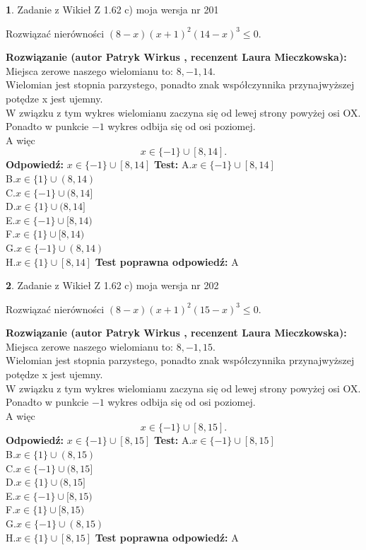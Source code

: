 \documentclass[12pt, a4paper]{article}
\theoremstyle{definition} %
\newtheorem{zad}{}
\newcommand{\zadStart}[1]{\begin{zad}#1\newline}
\newcommand{\zadStop}{\end{zad}}
\newcommand{\rozwStart}[2]{\noindent \textbf{Rozwiązanie (autor #1 , recenzent #2): }\newline}
\newcommand{\rozwStop}{\newline}
\newcommand{\odpStart}{\noindent \textbf{Odpowiedź:}\newline}
\newcommand{\odpStop}{\newline}
\newcommand{\testStart}{\noindent \textbf{Test:}\newline}
\newcommand{\testStop}{\newline}
\newcommand{\kluczStart}{\noindent \textbf{Test poprawna odpowiedź:}\newline}
\newcommand{\kluczStop}{\newline}
\begin{document}
\zadStart{Zadanie z Wikieł Z 1.62 c) moja wersja nr 201}

Rozwiązać nierówności $(8-x)(x+1)^{2}(14-x)^{3}\le0$.
\zadStop
\rozwStart{Patryk Wirkus}{Laura Mieczkowska}
Miejsca zerowe naszego wielomianu to: $8, -1, 14$.\\
Wielomian jest stopnia parzystego, ponadto znak współczynnika przy\linebreak najwyższej potędze x jest ujemny.\\ W związku z tym wykres wielomianu zaczyna się od lewej strony powyżej osi OX.\\
Ponadto w punkcie $-1$ wykres odbija się od osi poziomej.\\
A więc $$x \in \{-1\} \cup [8,14].$$
\rozwStop
\odpStart
$x \in \{-1\} \cup [8,14]$
\odpStop
\testStart
A.$x \in \{-1\} \cup [8,14]$\\
B.$x \in \{1\} \cup (8,14)$\\
C.$x \in \{-1\} \cup (8,14]$\\
D.$x \in \{1\} \cup (8,14]$\\
E.$x \in \{-1\} \cup [8,14)$\\
F.$x \in \{1\} \cup [8,14)$\\
G.$x \in \{-1\} \cup (8,14)$\\
H.$x \in \{1\} \cup [8,14]$
\testStop
\kluczStart
A
\kluczStop



\zadStart{Zadanie z Wikieł Z 1.62 c) moja wersja nr 202}

Rozwiązać nierówności $(8-x)(x+1)^{2}(15-x)^{3}\le0$.
\zadStop
\rozwStart{Patryk Wirkus}{Laura Mieczkowska}
Miejsca zerowe naszego wielomianu to: $8, -1, 15$.\\
Wielomian jest stopnia parzystego, ponadto znak współczynnika przy\linebreak najwyższej potędze x jest ujemny.\\ W związku z tym wykres wielomianu zaczyna się od lewej strony powyżej osi OX.\\
Ponadto w punkcie $-1$ wykres odbija się od osi poziomej.\\
A więc $$x \in \{-1\} \cup [8,15].$$
\rozwStop
\odpStart
$x \in \{-1\} \cup [8,15]$
\odpStop
\testStart
A.$x \in \{-1\} \cup [8,15]$\\
B.$x \in \{1\} \cup (8,15)$\\
C.$x \in \{-1\} \cup (8,15]$\\
D.$x \in \{1\} \cup (8,15]$\\
E.$x \in \{-1\} \cup [8,15)$\\
F.$x \in \{1\} \cup [8,15)$\\
G.$x \in \{-1\} \cup (8,15)$\\
H.$x \in \{1\} \cup [8,15]$
\testStop
\kluczStart
A
\kluczStop
\end{document}
